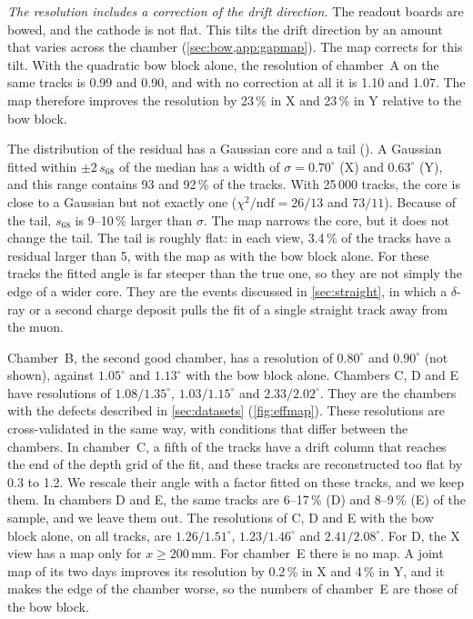 \emph{The resolution includes a correction of the drift direction.} The readout boards are bowed, and the cathode is
not flat. This tilts the drift direction by an amount that varies across the chamber (\cref{sec:bow,app:gapmap}). The
map corrects for this tilt. With the quadratic bow block alone, the resolution of chamber~A on the same tracks is
0.99\textdegree{} and 0.90\textdegree, and with no correction at all it is 1.10\textdegree{} and 1.07\textdegree.
The map therefore improves the resolution by 23\,\% in X and 23\,\% in Y relative to the bow block.

The distribution of the residual has a Gaussian core and a tail (). A Gaussian fitted within
$\pm2\,s_{68}$ of the median has a width of $\sigma=0.70^\circ$ (X) and $0.63^\circ$ (Y), and this range contains 93
and 92\,\% of the tracks. With 25\,000 tracks, the core is close to a Gaussian but not exactly one
($\chi^2/\mathrm{ndf}=26/13$ and $73/11$). Because of the tail, $s_{68}$ is 9--10\,\% larger than $\sigma$. The map
narrows the core, but it does not change the tail. The tail is roughly flat: in each view, 3.4\,\% of the tracks have a
residual larger than 5\textdegree, with the map as with the bow block alone. For these tracks the
fitted angle is far steeper than the true one, so they are not simply the edge of a wider core. They are the events
discussed in \cref{sec:straight}, in which a $\delta$-ray or a second charge deposit pulls the fit of a single
straight track away from the muon.

Chamber~B, the second good chamber, has a resolution of $0.80^\circ$ and $0.90^\circ$ (not shown), against $1.05^\circ$
and $1.13^\circ$ with the bow block alone. Chambers C, D and E have resolutions of $1.08/1.35^\circ$,
$1.03/1.15^\circ$ and $2.33/2.02^\circ$. They are the chambers with the defects described in \cref{sec:datasets}
(\cref{fig:effmap}). These resolutions are cross-validated in the same way, with conditions that differ
between the chambers. In chamber~C, a fifth of the tracks have a drift column that reaches the end of the depth grid
of the fit, and these tracks are reconstructed too flat by 0.3 to 1.2\textdegree. We rescale their angle with a factor
fitted on these tracks, and we keep them. In chambers D and E, the same tracks are 6--17\,\% (D) and 8--9\,\% (E) of the
sample, and we leave them out. The resolutions of C, D and E with the bow block alone, on all tracks, are
$1.26/1.51^\circ$, $1.23/1.46^\circ$ and $2.41/2.08^\circ$. For D, the X view has a map only for $x\ge200$\,mm.
For chamber~E there is no map. A joint map of its two days improves its resolution by 0.2\,\% in X and 4\,\% in Y,
and it makes the edge of the chamber worse, so the numbers of chamber~E are those of the bow block.

